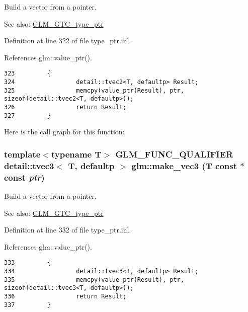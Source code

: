 Build a vector from a pointer. \begin{Desc}
\item[See also:]\hyperlink{group__gtc__type__ptr}{GLM\_\-GTC\_\-type\_\-ptr} \end{Desc}


Definition at line 322 of file type\_\-ptr.inl.

References glm::value\_\-ptr().

\begin{Code}\begin{verbatim}323         {
324                 detail::tvec2<T, defaultp> Result;
325                 memcpy(value_ptr(Result), ptr, sizeof(detail::tvec2<T, defaultp>));
326                 return Result;
327         }
\end{verbatim}
\end{Code}




Here is the call graph for this function:\hypertarget{group__gtc__type__ptr_g0b727d0acba617ec7b9af9f06892336a}{
\subsubsection[make\_\-vec3]{\setlength{\rightskip}{0pt plus 5cm}template$<$typename T$>$ GLM\_\-FUNC\_\-QUALIFIER detail::tvec3$<$ T, defaultp $>$ glm::make\_\-vec3 (T const $\ast$const  {\em ptr})}}
\label{group__gtc__type__ptr_g0b727d0acba617ec7b9af9f06892336a}


Build a vector from a pointer. \begin{Desc}
\item[See also:]\hyperlink{group__gtc__type__ptr}{GLM\_\-GTC\_\-type\_\-ptr} \end{Desc}


Definition at line 332 of file type\_\-ptr.inl.

References glm::value\_\-ptr().

\begin{Code}\begin{verbatim}333         {
334                 detail::tvec3<T, defaultp> Result;
335                 memcpy(value_ptr(Result), ptr, sizeof(detail::tvec3<T, defaultp>));
336                 return Result;
337         }
\end{verbatim}
\end{Code}




